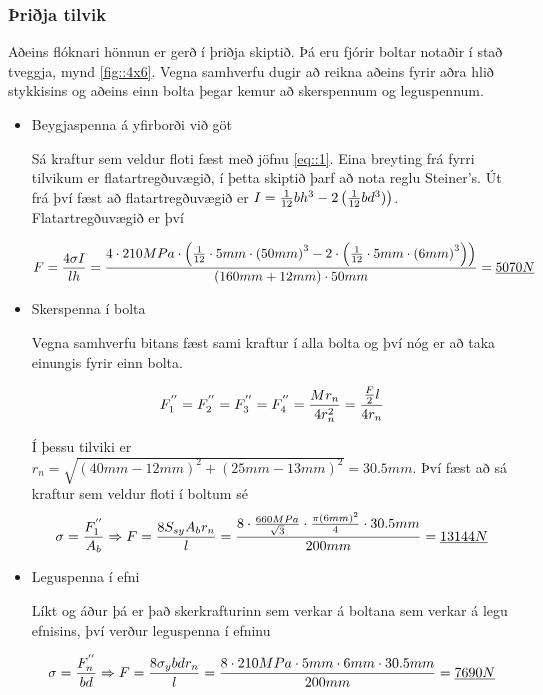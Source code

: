 \subsubsection{Þriðja tilvik}

Aðeins flóknari hönnun er gerð í þriðja skiptið. 
Þá eru fjórir boltar notaðir í stað tveggja, \sbr mynd \ref{fig::4x6}. 
Vegna samhverfu dugir að reikna aðeins fyrir aðra hlið stykkisins og aðeins einn bolta þegar kemur að skerspennum og leguspennum.

\begin{itemize}
\item Beygjaspenna á yfirborði við göt
  
  Sá kraftur sem veldur floti fæst með jöfnu \ref{eq::1}. 
  Eina breyting frá fyrri tilvikum er flatartregðuvægið, í þetta skiptið þarf að nota reglu Steiner's. 
  Út frá því fæst að flatartregðuvægið er $I = {1 \over 12}bh^3 - 2\left({1 \over 12}bd^3)\right)$. 
  Flatartregðuvægið er því
  
  \[
  F = \frac{4 \sigma I}{l h} 
  = 
  {
    4 \cdot 210 MPa \cdot 
    \left(
      {1 \over 12} \cdot 5 mm \cdot 
      \left(
        50mm
      \right)^3 
      - 2 \cdot 
      \left(
        {1 \over 12} \cdot 5 mm \cdot 
        \left(
          6mm
        \right)^3
      \right)
    \right) 
    \over 
    (160 mm + 12 mm) \cdot 50 mm
  } 
  = \underline{5070N}
  \] 
  
\item Skerspenna í bolta
  
  Vegna samhverfu bitans fæst sami kraftur í alla bolta og því nóg er að taka einungis fyrir einn bolta.
  
  \[
  F_1^{''} 
  = F_2^{''} 
  = F_3^{''} 
  = F_4^{''} 
  = {Mr_n \over 4r_n^2} 
  = {{F \over 2}l \over 4 r_n} 
  \]
  
  Í þessu tilviki er $r_n = \sqrt{(40mm - 12mm)^2 + (25mm - 13mm)^2} = 30.5 mm$. 
  Því fæst að sá kraftur sem veldur floti í boltum sé 
  \[
  \sigma = {F_1^{''} \over A_b} 
  \Rightarrow F 
  = {8 S_{sy} A_b r_n \over l} 
  = {8 \cdot {660MPa \over \sqrt{3}} \cdot 
    {
      \pi 
      \left(
        6mm
      \right)^2 
      \over 
      4
    } 
    \cdot 30.5 mm \over 200 mm
  } 
  = \underline{13144N}
  \]
  
  
\item Leguspenna í efni
  
  Líkt og áður þá er það skerkrafturinn sem verkar á boltana sem verkar á legu efnisins, því verður leguspenna í efninu
  
  \[
  \sigma = {F_n^{''} \over bd} 
  \Rightarrow F
  = {8 \sigma_{y} b d r_n \over l} 
  = {
    8 \cdot 210 MPa \cdot 5 mm \cdot 6 mm \cdot 30.5 mm 
    \over 
    200mm
  } 
  = \underline{7690N}
  \]

\end{itemize}

